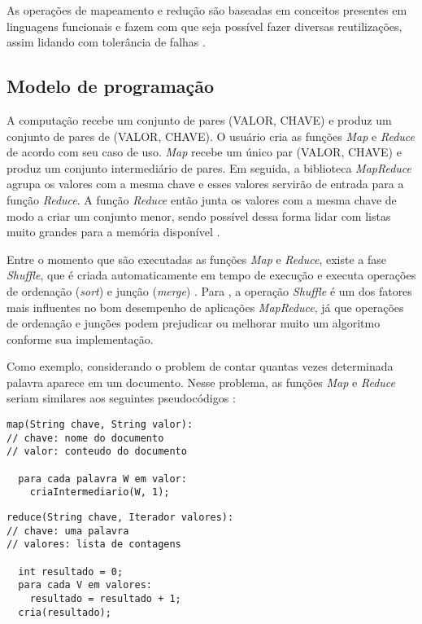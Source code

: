 As operações de mapeamento e redução são baseadas em conceitos presentes em linguagens funcionais e fazem com que seja possível fazer diversas reutilizações, assim lidando com tolerância de falhas \cite{MapReduce08}.

\subsection{Modelo de programação}\label{ssec:mapreducemodelo}

A computação recebe um conjunto de pares (VALOR, CHAVE) e produz um conjunto de pares de (VALOR, CHAVE). O usuário cria as funções \textit{Map} e \textit{Reduce} de acordo com seu caso de uso. \textit{Map} recebe um único par (VALOR, CHAVE) e produz um conjunto intermediário de pares. Em seguida, a biblioteca \textit{MapReduce} agrupa os valores com a mesma chave e esses valores servirão de entrada para a função \textit{Reduce}. A função \textit{Reduce} então junta os valores com a mesma chave de modo a criar um conjunto menor, sendo possível dessa forma lidar com listas muito grandes para a memória disponível \cite{MapReduce08}. 

Entre o momento que são executadas as funções \textit{Map} e \textit{Reduce}, existe a fase \textit{Shuffle}, que é criada automaticamente em tempo de execução e executa operações de ordenação (\textit{sort}) e junção (\textit{merge}) \cite{ProHadoop09}. Para \textcite{HadoopBook15}, a operação \textit{Shuffle} é um dos fatores mais influentes no bom desempenho de aplicações \textit{MapReduce}, já que operações de ordenação e junções podem prejudicar ou melhorar muito um algoritmo conforme sua implementação.

Como exemplo, considerando o problem de contar quantas vezes determinada palavra aparece em um documento. Nesse problema, as funções \textit{Map} e \textit{Reduce} seriam similares aos seguintes pseudocódigos \cite{MapReduce08}:

\begin{lstlisting}[caption={Exemplo de função Map em pseudocódigo adaptado de \cite{MapReduce08}}, label=code:codigo1]
map(String chave, String valor):
// chave: nome do documento
// valor: conteudo do documento

  para cada palavra W em valor:
    criaIntermediario(W, 1);
\end{lstlisting}

\begin{lstlisting}[caption={Exemplo de função Reduce em pseudocódigo adaptado de \cite{MapReduce08}}, label=code:codigo2]
reduce(String chave, Iterador valores):
// chave: uma palavra
// valores: lista de contagens

  int resultado = 0;
  para cada V em valores:
    resultado = resultado + 1;
  cria(resultado);
\end{lstlisting}

